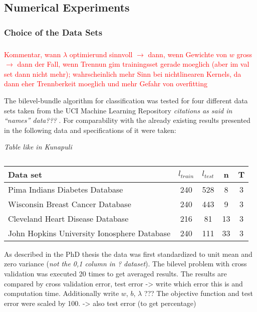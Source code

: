 \subsection{Numerical Experiments}

\subsubsection{Choice of the Data Sets}


\subsubsection{}














\textcolor{red}{Kommentar, wann \(\lambda\) optimierund sinnvoll \(\to\) dann, wenn Gewichte von \(w\) gross \(\to \) dann der Fall, wenn Trennun gim trainingsset gerade moeglich (aber im val set dann nicht mehr); wahrscheinlich mehr Sinn bei nichtlinearen Kernels, da dann eher Trennberkeit moeglich und mehr Gefahr von overfitting}

The bilevel-bundle algorithm for classification was tested for four different data sets taken from the UCI Machine Learning Repository \emph{citations as said in ``names'' data??? }.
For comparability with the already existing results presented in \cite{Kunapuli2008} the following data and specifications of it were taken:

\begin{center}
\emph{Table like in Kunapuli}
\begin{table}[H]%
	\begin{tabular}{lcccc}
		\hline
    Data set & \(l_{train}\) & \(l_{test}\) & n & T \\
		\hline
		Pima Indians Diabetes Database & 240 & 528 & 8 & 3 \\
		Wisconsin Breast Cancer Database & 240 & 443 & 9 & 3 \\
		Cleveland Heart Disease Database & 216 & 81 & 13 & 3 \\
		John Hopkins University Ionosphere Database & 240 & 111 & 33 & 3
	\end{tabular}
	\caption{}
	\label{}
\end{table}
\end{center}

As described in the PhD thesis the data was first standardized to unit mean and zero variance (\emph{not the 0,1 column in ? dataset}). The bilevel problem with cross validation was executed 20 times to get averaged results.
The results are compared by cross validation error, test error -> write which error this is and computation time.
Additionally write \(w\), \(b\), \(\lambda\) ???
The objective function and test error were scaled by 100. -> also test error (to get percentage) 

